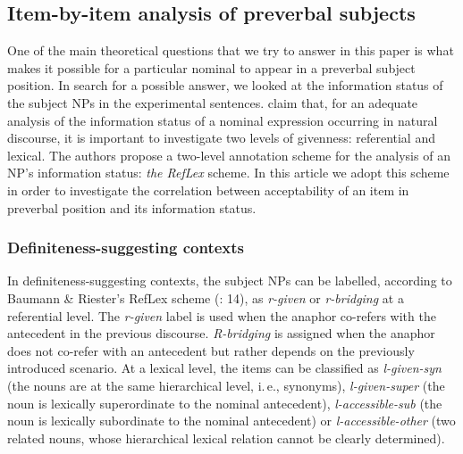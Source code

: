 \documentclass[output=paper]{langsci/langscibook}
\begin{document}
\subsection{Item-by-item analysis of preverbal subjects}\label{2sec:34}

One of the main theoretical questions that we try to answer in this paper is what makes it possible for a particular nominal to appear in a preverbal subject position. In search for a possible answer, we looked at the information status of the subject NPs in the experimental sentences. \cite{baumann:riester:12} claim that, for an adequate analysis of the information status of a nominal expression occurring in natural discourse, it is important to investigate two levels of givenness: referential and lexical. The authors propose a two-level annotation scheme for the analysis of an NP's information status: {\emph{the RefLex}} scheme. In this article we adopt this scheme in order to investigate the correlation between acceptability of an item in preverbal position and its information status.

\subsubsection{Definiteness-suggesting contexts}\label{2sec:341}

In definiteness-suggesting contexts, the subject NPs can be labelled, according to Baumann \& Riester's RefLex scheme (\citeyear{baumann:riester:12}: 14), as {\emph{r-given}} or {\emph{r-bridging}} at a referential level. The {\emph{r-given}} label is used when the anaphor co-refers with the antecedent in the previous discourse. {\emph{R-bridging}} is assigned when the anaphor does not co-refer with an antecedent but rather depends on the previously introduced scenario. At a lexical level, the items can be classified \citep[][18-19]{baumann:riester:12} as {\emph{l-given-syn}} (the nouns are at the same hierarchical level, i.\,e., synonyms), {\emph{l-given-super}} (the noun is lexically superordinate to the nominal antecedent), {\emph{l-accessible-sub}} (the noun is lexically subordinate to the nominal antecedent) or {\emph{l-accessible-other}} (two related nouns, whose hierarchical lexical relation cannot be clearly determined).
\end{document}

